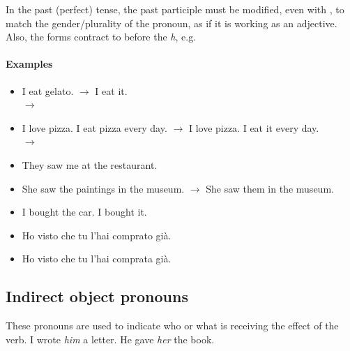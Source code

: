 In the past (perfect) tense, the past participle must be modified, even with ,
to match the gender/plurality of the pronoun, as if it is working as an adjective.
Also, the  forms contract to  before the \textit{h}, e.g.

\paragraph{Examples}
\begin{itemize}
	\item{I eat gelato. $\rightarrow$ I eat it.}       \\
	 $\rightarrow$ 

	\item{I love pizza. I eat pizza every day. $\rightarrow$ I love pizza. I eat it every day.} \\
	 $\rightarrow$ 

	\item{They saw me at the restaurant.} \\

	\item{She saw the paintings in the museum. $\rightarrow$ She saw them in the museum.} \\

	\item{I bought the car. I bought it.} \\

	\item{Ho visto che tu l'hai comprato già.} \\

	\item {Ho visto che tu l'hai comprata già.} \\
\end{itemize}

\subsection{Indirect object pronouns}
These pronouns are used to indicate who or what is receiving the effect of the verb.
I wrote \textit{him} a letter. He gave \textit{her} the book.

